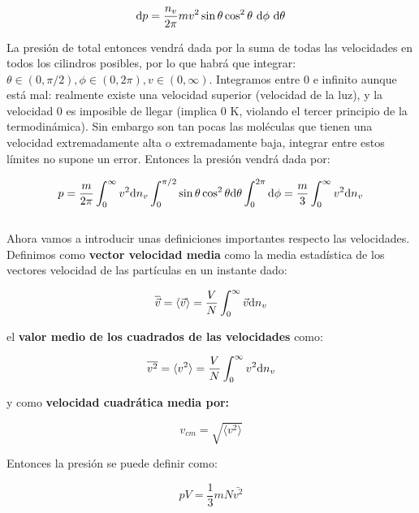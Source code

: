 \documentclass[12pt]{book}
\begin{document}
\begin{equation}
\mathrm{d} p = \dfrac{n_v}{2 \pi} m v^2 \sin \theta \cos^2 \theta \ \mathrm{d} \phi \ \mathrm{d} \theta 
\end{equation}

La presión de total entonces vendrá dada por la suma de todas las velocidades en todos los cilindros posibles, por lo que habrá que integrar: $\theta \in (0,\pi/2), \phi \in (0, 2 \pi), v \in (0, \infty)$. Integramos entre 0 e infinito aunque está mal: realmente existe una velocidad superior (velocidad de la luz), y la velocidad $0$ es imposible de llegar (implica 0 K, violando el tercer principio de la termodinámica). Sin embargo son tan pocas las moléculas que tienen una velocidad extremadamente alta o extremadamente baja, integrar entre estos límites no supone un error. Entonces la presión vendrá dada por:

\begin{equation}
p = \dfrac{m}{2 \pi} \int_{0}^{\infty} v^2 \mathrm{d} n_v \int_{0}^{\pi/2} \sin \theta \cos^2 \theta \mathrm{d} \theta \int_0^{2 \pi} \mathrm{d} \phi = \dfrac{m}{3} \int_{0}^{\infty} v^2 \mathrm{d} n_v
\end{equation}\\



Ahora vamos a introducir unas definiciones importantes respecto las velocidades. Definimos como \textbf{vector velocidad media} como la media estadística de los vectores velocidad de las partículas en un instante dado:

\begin{equation}
\overline{\vec{v}}= \langle \vec{v} \rangle = \dfrac{V}{N} \int_{0}^{\infty} \vec{v} \mathrm{d} n_v
\end{equation}

el \textbf{valor medio de los cuadrados de las velocidades} como:

\begin{equation}
\overline{v^2} = \langle v^2 \rangle = \dfrac{V}{N} \int_{0}^{\infty} v^2 \mathrm{d} n_v
\end{equation}

y como \textbf{velocidad cuadrática media por:}

\begin{equation}
v_{cm} = \sqrt{ \langle v^2 \rangle}
\end{equation}

Entonces la presión se puede definir como:

\begin{equation}
p V = \dfrac{1}{3} m N \bar{v^2}
\end{equation}
\end{document}

